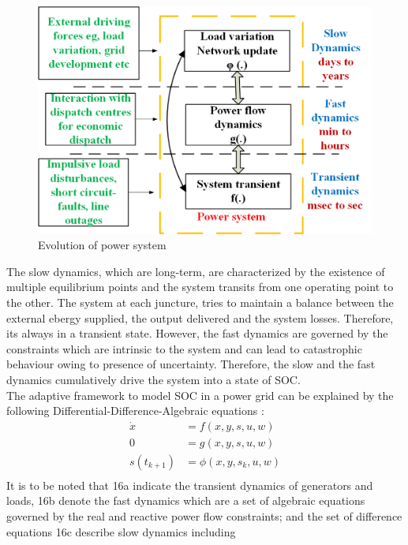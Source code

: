 \documentclass{ifacconf}
\begin{document}
\begin{figure}[h]
\centering
\includegraphics[scale=0.45]{power_evolution.png}
\caption{Evolution of power system }
\label{fig:4}
\end{figure}
The slow dynamics, which are long-term, are characterized by the existence of multiple equilibrium points and the system transits from one operating point to the other. The system at each juncture, tries to maintain a balance between the external ebergy supplied, the output delivered and the system losses. Therefore, its always in a transient state. However, the fast dynamics are governed by the constraints which are intrinsic to the system and can lead to catastrophic behaviour owing to presence of uncertainty.  Therefore, the slow and the fast dynamics cumulatively drive the system into a state of SOC. \\
The adaptive framework to model SOC in a power grid can be explained by the following Differential-Difference-Algebraic equations \citep{Mei}:\\
\begin{subequations}
\begin{align}
   \dot x &=f(x,y,s,u,w)  \\
  0 &=g(x,y,s,u,w)  \\
  s(t_{k+1}) &=\phi(x,y,s_{k}, u,w)\\
\end{align}
\end{subequations}
It is to be noted that {16a} indicate the transient dynamics of generators and loads, {16b} denote the  fast dynamics which are a set of algebraic equations governed by the real and reactive power flow constraints; and the set of
difference equations {16c} describe slow dynamics including
\end{document}
